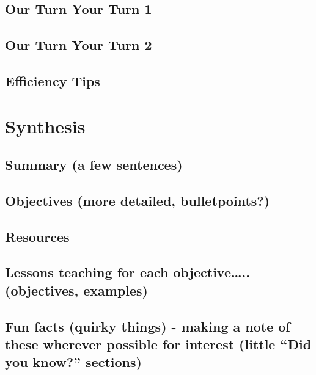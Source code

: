 \documentclass[]{book}
\begin{document}
\hypertarget{our-turn-your-turn-1-5}{%
\section{Our Turn Your Turn 1}\label{our-turn-your-turn-1-5}}

\hypertarget{our-turn-your-turn-2-6}{%
\section{Our Turn Your Turn 2}\label{our-turn-your-turn-2-6}}

\hypertarget{efficiency-tips-6}{%
\section{Efficiency Tips}\label{efficiency-tips-6}}

\hypertarget{synthesis}{%
\chapter{Synthesis}\label{synthesis}}

\hypertarget{summary-a-few-sentences-7}{%
\section{Summary (a few sentences)}\label{summary-a-few-sentences-7}}

\hypertarget{objectives-more-detailed-bulletpoints-7}{%
\section{Objectives (more detailed, bulletpoints?)}\label{objectives-more-detailed-bulletpoints-7}}

\hypertarget{resources-7}{%
\section{Resources}\label{resources-7}}

\hypertarget{lessons-teaching-for-each-objective..-objectives-examples-6}{%
\section{Lessons teaching for each objective\ldots{}.. (objectives, examples)}\label{lessons-teaching-for-each-objective..-objectives-examples-6}}

\hypertarget{fun-facts-quirky-things---making-a-note-of-these-wherever-possible-for-interest-little-did-you-know-sections-6}{%
\section{Fun facts (quirky things) - making a note of these wherever possible for interest (little ``Did you know?'' sections)}\label{fun-facts-quirky-things---making-a-note-of-these-wherever-possible-for-interest-little-did-you-know-sections-6}}
\end{document}

